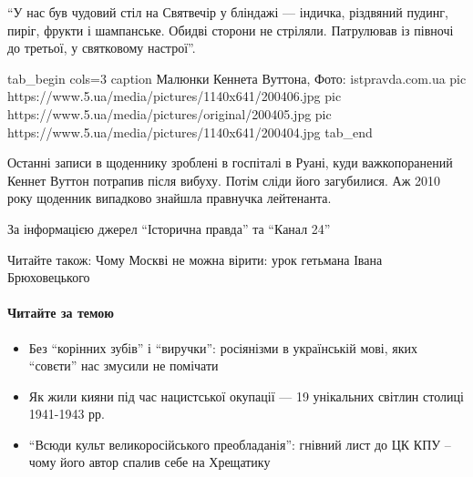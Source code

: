 \begin{itemize}
\enquote{У нас був чудовий стіл на Святвечір у бліндажі --- індичка, різдвяний
пудинг, пиріг, фрукти і шампанське. Обидві сторони не стріляли. Патрулював
із півночі до третьої, у святковому настрої}.

\ifcmt
tab_begin cols=3
	caption Малюнки Кеннета Вуттона, Фото: istpravda.com.ua
	pic https://www.5.ua/media/pictures/1140x641/200406.jpg
	pic https://www.5.ua/media/pictures/original/200405.jpg
	pic https://www.5.ua/media/pictures/1140x641/200404.jpg
tab_end
\fi

Останні записи в щоденнику зроблені в госпіталі в Руані, куди
важкопоранений Кеннет Вуттон потрапив після вибуху. Потім сліди його
загубилися. Аж 2010 року щоденник випадково знайшла правнучка лейтенанта.

\end{itemize}

За інформацією джерел \enquote{Історична правда} та \enquote{Канал 24}

Читайте також: Чому Москві не можна вірити: урок гетьмана Івана
Брюховецького

\paragraph{Читайте за темою}

\begin{itemize}
	
\item Без \enquote{корінних зубів} і \enquote{виручки}: росіянізми в українській мові, яких \enquote{совєти}
нас змусили не помічати

\item Як жили кияни під час нацистської окупації --- 19 унікальних світлин столиці
1941-1943 рр.

\item \enquote{Всюди культ великоросійського преобладанія}: гнівний лист до ЦК КПУ –
				чому його автор спалив себе на Хрещатику
\end{itemize}

